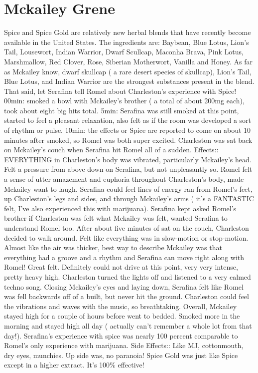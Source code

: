 \documentclass[12pt]{book}
\begin{document}
\chapter{Mckailey Grene}

Spice and Spice Gold are relatively new herbal blends that have recently become available in the United States. The ingredients are: Baybean, Blue Lotus, Lion's Tail, Lousewort, Indian Warrior, Dwarf Scullcap, Maconha Brava, Pink Lotus, Marshmallow, Red Clover, Rose, Siberian Motherwort, Vanilla and Honey. As far as Mckailey know, dwarf skullcap ( a rare desert species of skullcap), Lion's Tail, Blue Lotus, and Indian Warrior are the strongest substances present in the blend. That said, let Serafina tell Romel about Charleston's experience with Spice! 00min: smoked a bowl with Mckailey's brother ( a total of about 200mg each), took about eight big hits total. 5min: Serafina was still smoked at this point, started to feel a pleasant relaxation, also felt as if the room was developed a sort of rhythm or pulse. 10min: the effects or Spice are reported to come on about 10 minutes after smoked, so Romel was both super excited. Charleston was sat back on Mckailey's couch when Serafina hit Romel all of a sudden. Effects:: EVERYTHING in Charleston's body was vibrated, particularly Mckailey's head. Felt a pressure from above  down on Serafina, but not unpleasantly so. Romel felt a sense of utter amazement and euphoria throughout Charleston's body, made Mckailey want to laugh. Serafina could feel lines of energy ran from Romel's feet, up Charleston's legs and sides, and through Mckailey's arms ( it's a FANTASTIC felt, I've also experienced this with marijuana). Serafina kept asked Romel's brother if Charleston was felt what Mckailey was felt, wanted Serafina to understand Romel too. After about five minutes of sat on the couch, Charleston decided to walk around. Felt like everything was in slow-motion or stop-motion. Almost like the air was thicker, best way to describe Mckailey was that everything had a groove and a rhythm and Serafina can move right along with Romel! Great felt. Definitely could not drive at this point, very very intense, pretty heavy high. Charleston turned the lights off and listened to a very calmed techno song. Closing Mckailey's eyes and laying down, Serafina felt like Romel was fell backwards off of a built, but never hit the ground. Charleston could feel the vibrations and waves with the music, so breathtaking. Overall, Mckailey stayed high for a couple of hours before went to bedded. Smoked more in the morning and stayed high all day ( actually can't remember a whole lot from that day!). Serafina's experience with spice was nearly 100 percent comparable to Romel's only experience with marijuana. Side Effects:: Like MJ, cottonmouth, dry eyes, munchies. Up side was, no paranoia! Spice Gold was just like Spice except in a higher extract. It's 100\% effective!
\end{document}
